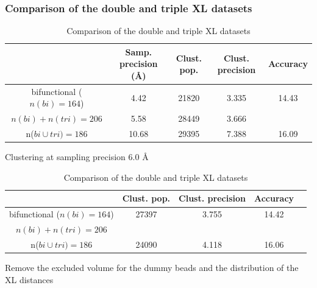 \documentclass[a4paper,8pt]{beamer}
\begin{document}
%
\begin{frame}
\frametitle{Comparison of the double and triple XL datasets}
\begin{table}
  \centering
  \caption{Comparison of the double and triple XL datasets}
  \begin{tabular}{|c|c|c|c|c|}
      \hline
                                   & Samp. precision ({\AA}) & Clust. pop. & Clust. precision & Accuracy\\ \hline
      bifunctional ($n(bi) = 164$) & 4.42  & 21820 & 3.335 & 14.43 \\\hline
      $n(bi) + n(tri) = 206$       & 5.58  & 28449 & 3.666 & \\ \hline
      n($bi \cup tri) = 186$       & 10.68 & 29395 & 7.388 &  16.09 \\\hline
  \end{tabular}
\end{table}
Clustering at sampling precision $6.0$ {\AA}
\begin{table}
  \centering
  \caption{Comparison of the double and triple XL datasets}
  \begin{tabular}{|c|c|c|c|c|}
      \hline
                                   & Clust. pop. & Clust. precision & Accuracy\\ \hline
      bifunctional ($n(bi) = 164$) & 27397 & 3.755 & 14.42\\ \hline
      $n(bi) + n(tri) = 206$       &  &  & \\ \hline
      n($bi \cup tri) = 186$       & 24090 & 4.118 & 16.06\\ \hline
  \end{tabular}
\end{table}
\begin{block}{}
  Remove the excluded volume for the dummy beads and the distribution of the XL distances 
\end{block}
\end{frame}
%
\end{document}
